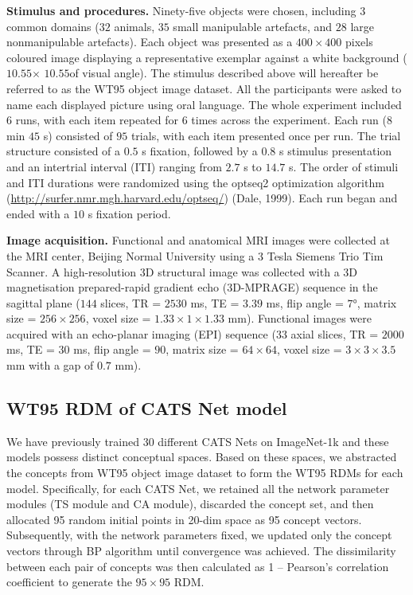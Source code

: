 \documentclass[pdflatex,sn-mathphys-num,lineno]{sn-jnl}%
\begin{document}
\begin{CJK}{UTF8}{gbsn}
\textbf{Stimulus and procedures.} Ninety-five objects were chosen, including $3$ common domains ($32$ animals, $35$ small manipulable artefacts, and $28$ large nonmanipulable artefacts). Each object was presented as a $400\times400$ pixels coloured image displaying a representative exemplar against a white background ($10.55$\textdegree $\times$ $10.55$\textdegree of visual angle). The stimulus described above will hereafter be referred to as the WT95 object image dataset. All the participants were asked to name each displayed picture using oral language. The whole experiment included $6$ runs, with each item repeated for $6$ times across the experiment. Each run ($8$ min $45$ s) consisted of $95$ trials, with each item presented once per run. The trial structure consisted of a $0.5$ s fixation, followed by a $0.8$ s stimulus presentation and an intertrial interval (ITI) ranging from $2.7$ s to $14.7$ s. The order of stimuli and ITI durations were randomized using the optseq2 optimization algorithm (\url{http://surfer.nmr.mgh.harvard.edu/optseq/}) (Dale, 1999). Each run began and ended with a $10$ s fixation period.

\textbf{Image acquisition.} Functional and anatomical MRI images were collected at the MRI center, Beijing Normal University using a $3$ Tesla Siemens Trio Tim Scanner. A high-resolution 3D structural image was collected with a 3D magnetisation prepared-rapid gradient echo (3D-MPRAGE) sequence in the sagittal plane ($144$ slices, TR = $2530$ ms, TE = $3.39$ ms, flip angle = $7$°, matrix size = $256\times256$, voxel size = $1.33\times 1\times1.33$ mm). Functional images were acquired with an echo-planar imaging (EPI) sequence (33 axial slices, TR = $2000$ ms, TE = $30$ ms, flip angle = $90$\textdegree, matrix size = $64\times64$, voxel size = $3\times3\times3.5$ mm with a gap of $0.7$ mm).

\subsection{WT95 RDM of CATS Net model}
We have previously trained 30 different CATS Nets on ImageNet-1k and these models possess distinct conceptual spaces. Based on these spaces, we abstracted the concepts from WT95 object image dataset to form the WT95 RDMs for each model. Specifically, for each CATS Net, we retained all the network parameter modules (TS module and CA module), discarded the concept set, and then allocated 95 random initial points in 20-dim space as 95 concept vectors. Subsequently, with the network parameters fixed, we updated only the concept vectors through BP algorithm until convergence was achieved. The dissimilarity between each pair of concepts was then calculated as 1 – Pearson’s correlation coefficient to generate the $95\times95$ RDM. 


\end{CJK}
\end{document}
